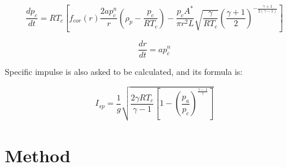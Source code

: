 \documentclass[letterpaper,12pt]{article}
\begin{document}
\begin{equation}
	\boxed{\frac{dp_c}{dt} = RT_c[f_{cor}(r)\frac{2ap_c^{n}}{r}(\rho_{p} - \frac{p_c}{RT_c}) - \frac{p_cA^{*}}{\pi r^{2}L}\sqrt{\frac{\gamma}{RT_c}}(\frac{\gamma +1}{2})^{-\frac{\gamma +1}{2(\gamma -1)}}]}
\end{equation}

\begin{equation}
	\boxed{\frac{dr}{dt} = ap_c^{n}}
\end{equation}

Specific impulse is also asked to be calculated, and its formula is:

\begin{equation}
	\boxed{I_{sp} = \frac{1}{g}\sqrt{\frac{2\gamma RT_c}{\gamma -1}[1-(\frac{p_a}{p_c})^{\frac{\gamma -1}{\gamma}}]}}
\end{equation}

\section{Method}
\end{document}
